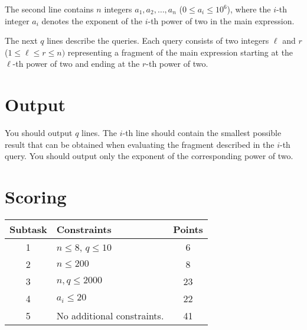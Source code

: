 The second line contains $n$ integers $a_{1}, a_{2}, \ldots, a_{n}$ ($0\leq a_{i} \leq 10^{6}$),
where the $i$-th integer $a_{i}$ denotes the exponent of the $i$-th power of two in
the main expression.

The next $q$ lines describe the queries. Each query consists of two integers $\ell$ and $r$
($1\leq \ell\leq r\leq n)$ representing a fragment of the main expression
starting at the $\ell$-th power of two and ending at the $r$-th power of two.

\section*{Output}
You should output $q$ lines. The $i$-th line should contain the smallest possible result
that can be obtained when evaluating the fragment described in the $i$-th query.
You should output only the exponent of the corresponding power of two.

\section*{Scoring}
\begin{center}
\begin{tabular}{|c|p{13cm}|c|}
\hline
\textbf{Subtask} & \textbf{Constraints} & \textbf{Points} \\ \hline
1 & $n \leq 8$, $q \leq 10$ & 6 \\\hline
2 & $n \leq 200$ & 8 \\\hline
3 & $n,q \leq 2000$ & 23 \\\hline
4 & $a_i \leq 20$ & 22 \\\hline
5 & No additional constraints. & 41 \\\hline
\end{tabular}
\end{center}
